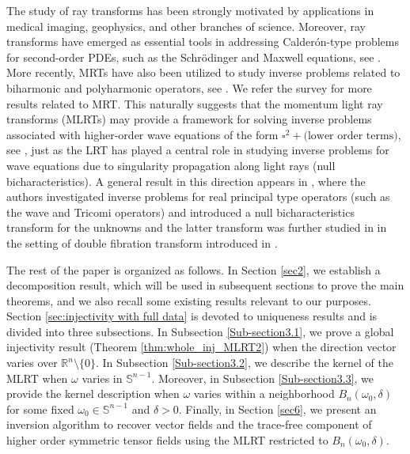 \documentclass[11pt,a4paper,reqno]{amsart}
\newcommand{\Rn}{\mathbb{R}^n}
\newcommand{\om}{\omega}
\newcommand{\sn}{\mathbb{S}^{n-1}}
\begin{document}
The study of ray transforms has been strongly motivated by applications in medical imaging, geophysics, and other branches of science. Moreover, ray transforms have emerged as essential tools in addressing Calder\'on-type problems for second-order PDEs, such as the Schr\"odinger and Maxwell equations, see \cite{Syl_Uhl,DKSU_invention,KSU_Maxwell,Uhlmann_survey}. More recently, MRTs have also been utilized to study inverse problems related to  biharmonic and polyharmonic operators, see \cite{BKS_MRT_polyharmonic,SS_linearized,BK_polyharmonic_localdata,BKSU_biharmonic_nonlinear}. We refer the survey \cite{Krishnan_Sahoo_IPMS} for more results related to MRT. This naturally suggests that the momentum light ray transforms (MLRTs) may provide a framework for solving inverse problems associated with higher-order wave equations of the form $\square^2 + \text{(lower order terms)}$, see  \cite{Isakov_biwave_type,BK_biwave}, just as the LRT has played a central role in studying inverse problems for wave equations due to singularity propagation along light rays (null bicharacteristics). 
A general result in this direction appears in \cite{Plamen_Yang,OSSU_real}, where the authors investigated inverse problems for real principal type operators (such as the wave and Tricomi operators) and introduced a null bicharacteristics transform for the unknowns and the latter transform was further studied in \cite{Marco_Salo_Tzou} in the setting of double fibration transform introduced in \cite{Helgason}.

The rest of the paper is organized as follows. In Section \ref{sec2}, we establish a decomposition result, which will be used in subsequent sections to prove the main theorems, and we also recall some existing results relevant to our purposes. Section \ref{sec:injectivity with full data} is devoted to uniqueness results and is divided into three subsections. In Subsection \ref{Sub-section3.1}, we prove a global injectivity result (Theorem \ref{thm:whole_inj_MLRT2}) when the direction vector varies over $\Rn \setminus \{0\}$. In Subsection \ref{Sub-section3.2}, we describe the kernel of the MLRT when $\omega$ varies in $\sn$. Moreover, in Subsection \ref{Sub-section3.3}, we provide the kernel description when $\omega$ varies within a neighborhood $B_n(\omega_0, \delta)$ for some fixed $\om_0\in \sn$ and $\delta > 0$. Finally, in Section \ref{sec6}, we present an inversion algorithm to recover vector fields and the trace-free component of higher order symmetric tensor fields using the MLRT restricted to $B_n(\omega_0, \delta)$.
\end{document}

